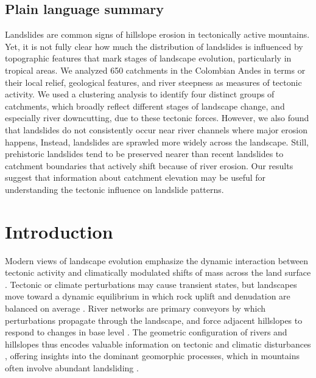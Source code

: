 \documentclass[draft]{agujournal2019}
\begin{document}
\subsection*{Plain language summary}
Landslides are common signs of hillslope erosion in tectonically active mountains. Yet, it is not fully clear how much the distribution of landslides is influenced by topographic features that mark stages of landscape evolution, particularly in tropical areas. We analyzed 650 catchments in the Colombian Andes in terms or their local relief, geological features, and river steepness as measures of tectonic activity. We used a clustering analysis to identify four distinct groups of catchments, which broadly reflect different stages of landscape change, and especially river downcutting, due to these tectonic forces. However, we also found that landslides do not consistently occur near river channels where major erosion happens, Instead, landslides are sprawled more widely across the landscape. Still, prehistoric landslides tend to be preserved nearer than recent landslides to catchment boundaries that actively shift because of river erosion. Our results suggest that information about catchment elevation may be useful for understanding the tectonic influence on landslide patterns.

\section{Introduction}
\par Modern views of landscape evolution emphasize the dynamic interaction between tectonic activity and climatically modulated shifts of mass across the land surface \cite{Davies2021, Whittaker2012, Irasema2002}. Tectonic or climate perturbations may cause transient states, but landscapes move toward a dynamic equilibrium in which rock uplift and denudation are balanced on average \cite{Whittaker2012, Wobus2006, Whipple2004}. River networks are primary conveyors by which perturbations propagate through the landscape, and force adjacent hillslopes to respond to changes in base level \cite{Whipple2004, howard1994}. The geometric configuration of rivers and hillslopes thus encodes valuable information on tectonic and climatic disturbances \cite{whipple2017, stock1999}, offering insights into the dominant geomorphic processes, which in mountains often involve abundant landsliding \cite{Larsen2012, korup2010, Montgomery2002, Campforts2020, Broeckx2020}. 
\end{document}
